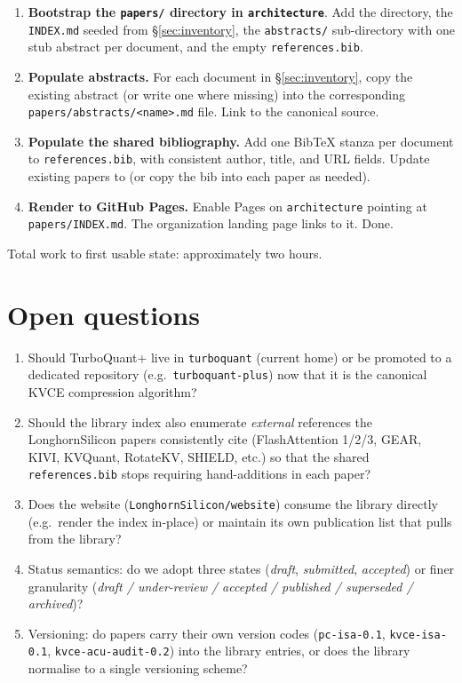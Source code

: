 \documentclass[11pt]{article}
\begin{document}
\begin{enumerate}
\item \textbf{Bootstrap the \texttt{papers/} directory in
\texttt{architecture}}. Add the directory, the \texttt{INDEX.md}
seeded from \S\ref{sec:inventory}, the \texttt{abstracts/}
sub-directory with one stub abstract per document, and the empty
\texttt{references.bib}.

\item \textbf{Populate abstracts.} For each document in
\S\ref{sec:inventory}, copy the existing abstract (or write one
where missing) into the corresponding
\texttt{papers/abstracts/<name>.md} file. Link to the canonical
source.

\item \textbf{Populate the shared bibliography.} Add one BibTeX
stanza per document to \texttt{references.bib}, with consistent
author, title, and URL fields. Update existing papers to
\verb|| (or copy
the bib into each paper as needed).

\item \textbf{Render to GitHub Pages.} Enable Pages on
\texttt{architecture} pointing at \texttt{papers/INDEX.md}. The
organization landing page links to it. Done.
\end{enumerate}

Total work to first usable state: approximately two hours.

\section{Open questions}

\begin{enumerate}
\item Should TurboQuant+ live in \texttt{turboquant} (current home)
or be promoted to a dedicated repository (e.g.\ \texttt{turboquant-plus})
now that it is the canonical KVCE compression algorithm?
\item Should the library index also enumerate \emph{external}
references the LonghornSilicon papers consistently cite (FlashAttention
1/2/3, GEAR, KIVI, KVQuant, RotateKV, SHIELD, etc.) so that
the shared \texttt{references.bib} stops requiring hand-additions
in each paper?
\item Does the website (\texttt{LonghornSilicon/website}) consume the
library directly (e.g.\ render the index in-place) or maintain its
own publication list that pulls from the library?
\item Status semantics: do we adopt three states
(\textit{draft}, \textit{submitted}, \textit{accepted}) or finer
granularity (\textit{draft / under-review / accepted / published /
superseded / archived})?
\item Versioning: do papers carry their own version codes
(\texttt{pc-isa-0.1}, \texttt{kvce-isa-0.1}, \texttt{kvce-acu-audit-0.2})
into the library entries, or does the library normalise to a single
versioning scheme?
\end{enumerate}
\end{document}
